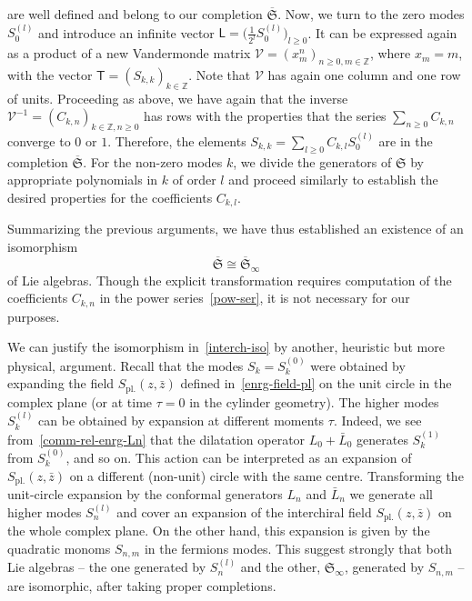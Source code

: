 \documentclass[11pt]{article}
\newcommand{\oZ}{\mathbb{Z}}
\newcommand{\interLie}{\mathfrak{S}}
\newcommand{\interch}{\interLie}
\newcommand{\interchco}{\overline{\interLie}}
\newcommand{\interinfin}{\interLie_{\infty}}
\newcommand{\interinfinco}{\overline{\interLie}_{\infty}}
\newcommand{\bz}{\bar{z}}
\newcommand{\enrg}{S}
\newcommand{\enrgpl}{\enrg_{\text{pl.}}}
\newcommand{\vand}{\mathscr{V}}
\newcommand{\Lv}{\mathsf{L}}
\newcommand{\Tv}{\mathsf{T}}
\theoremstyle{definition}
\begin{document}
are well defined and belong to our completion $\interchco$.
Now, we turn to the zero modes $\enrg^{(l)}_0$ and
introduce an infinite vector $\Lv = \bigl(\frac{1}{2^l}\enrg^{(l)}_0\bigr)_{l\geq0}$. It can be expressed again as a product of a new Vandermonde matrix
  $\vand=(x_m^n)_{n\geq0,m\in\oZ}$, where $x_m=m$, with the vector $\Tv=(\enrg_{k,k})_{k\in\oZ}$. Note that $\vand$ has again one column and one row of units.
Proceeding as above, we have again that the inverse  $\vand^{-1}=(C_{k,n})_{k\in\oZ,n\geq0}$ has rows with the properties that the series $\sum_{n\geq0}C_{k,n}$ converge to $0$ or $1$. Therefore, the elements $\enrg_{k,k}=\sum_{l\geq0}C_{k,l}\enrg_0^{(l)}$ are in the completion $\interchco$.
For the non-zero modes $k$, we divide the generators of $\interch$ by appropriate polynomials in $k$ of order $l$ and proceed similarly to establish the desired properties for the coefficients $C_{k,l}$.

Summarizing the previous arguments, we have thus established an existence of an isomorphism
\begin{equation}\label{interch-iso}
\interchco\cong\interinfinco
\end{equation}
of Lie algebras. Though the explicit transformation requires computation of the coefficients $C_{k,n}$ in the power series~\eqref{pow-ser}, it is not necessary for our purposes.


We can justify the isomorphism in~\eqref{interch-iso} by another, heuristic  but more physical, argument.
Recall  that the modes $\enrg_{k}=\enrg^{(0)}_{k}$ were obtained by expanding the
field $\enrgpl(z,\bz)$ defined in~\eqref{enrg-field-pl} on the unit
circle in the complex plane (or at  time $\tau=0$ in the cylinder geometry). The higher modes
$\enrg^{(l)}_{k}$ can be obtained by expansion at
different moments $\tau$. Indeed,
we see from~\eqref{comm-rel-enrg-Ln} that the dilatation operator
$L_0+\bar{L}_0$ generates $\enrg^{(1)}_{k}$ from $\enrg^{(0)}_{k}$, and so on.
This action can be interpreted as an expansion of $\enrgpl(z,\bz)$ on
a different (non-unit) circle with the same centre.
Transforming the unit-circle expansion by the conformal generators $L_n$
and $\bar{L}_n$ we generate all higher modes $\enrg^{(l)}_n$ and cover an expansion of the interchiral field
$\enrgpl(z,\bz)$ on the whole complex plane.
On the other hand,
this expansion is given by the quadratic monoms $\enrg_{n,m}$
in the  fermions modes. This suggest strongly  that  both   Lie algebras -- the one generated by $\enrg^{(l)}_n$ and the other, $\interinfin$,  generated by  $\enrg_{n,m}$ -- are  isomorphic, after taking proper completions.
\end{document}
